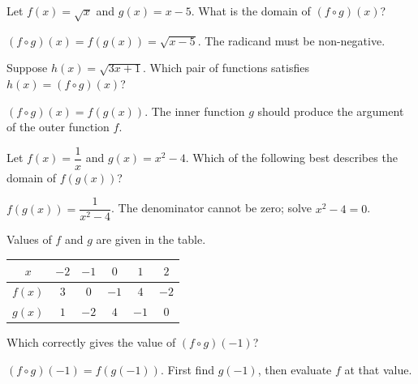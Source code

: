 \documentclass{ximera}
\begin{document}
\begin{problem}
Let $f(x) = \sqrt{x}$ and $g(x) = x - 5$. What is the domain of $(f \circ g)(x)$?
\begin{hint}
$(f\circ g)(x) = f(g(x)) = \sqrt{x-5}$. The radicand must be non-negative.
\end{hint}
\begin{multipleChoice}
\end{multipleChoice}
\end{problem}

\begin{problem}
Suppose $h(x) = \sqrt{3x+1}$. Which pair of functions satisfies $h(x) = (f\circ g)(x)$?
\begin{hint}
$(f\circ g)(x) = f(g(x))$. The inner function $g$ should produce the argument of the outer function $f$.
\end{hint}
\begin{multipleChoice}
\end{multipleChoice}
\end{problem}

\begin{problem}
Let $f(x) = \dfrac{1}{x}$ and $g(x) = x^2 - 4$. Which of the following best describes the domain of $f(g(x))$?
\begin{hint}
$f(g(x)) = \dfrac{1}{x^2-4}$. The denominator cannot be zero; solve $x^2-4=0$.
\end{hint}
\begin{multipleChoice}
  \choice{$(-\infty,\infty)$}
\end{multipleChoice}
\end{problem}

\begin{problem}
Values of $f$ and $g$ are given in the table.
\begin{center}
\begin{tabular}{c|ccccc}
$x$ & $-2$ & $-1$ & $0$ & $1$ & $2$ \\\hline
$f(x)$ & $3$ & $0$ & $-1$ & $4$ & $-2$ \\
$g(x)$ & $1$ & $-2$ & $4$ & $-1$ & $0$
\end{tabular}
\end{center}
Which correctly gives the value of $(f\circ g)(-1)$?
\begin{hint}
$(f\circ g)(-1) = f(g(-1))$. First find $g(-1)$, then evaluate $f$ at that value.
\end{hint}
\begin{multipleChoice}
\end{multipleChoice}
\end{problem}
\end{document}
